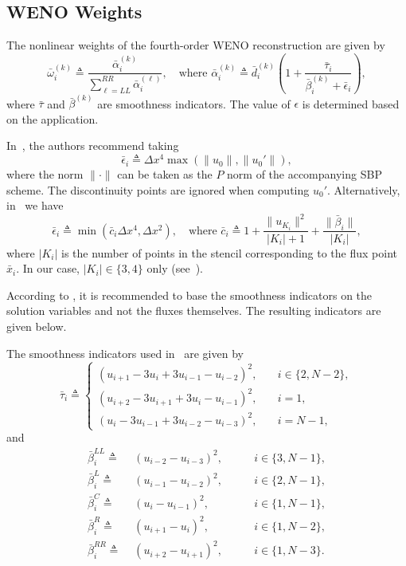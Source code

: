 \documentclass{scrartcl}
\begin{document}
\subsection{WENO Weights} %
\label{ssc:weno:weights}

\begin{definition} \label{def:weno:weights}
The nonlinear weights of the fourth-order WENO reconstruction are given by
\[
\bar{\omega}^{(k)}_i \triangleq \frac{\bar{\alpha}^{(k)}_i}{\displaystyle
    \sum_{\ell = LL}^{RR} \bar{\alpha}^{(\ell)}_i},
\quad \text{where }
\bar{\alpha}^{(k)}_i \triangleq \bar{d}^{(k)}_i \left(
1 + \frac{\bar{\tau}_i}{\bar{\beta}^{(k)}_i + \bar{\epsilon}_i}\right),
\]
where $\bar{\tau}$ and $\bar{\beta}^{(k)}$ are smoothness indicators. The value of
$\epsilon$ is determined based on the application.
\end{definition}

In~\cite{Fisher2011}, the authors recommend taking
\[
\bar{\epsilon}_i \triangleq \Delta x^4 \max (\|u_0\|, \|u_0'\|),
\]
where the norm $\|\cdot\|$ can be taken as the $P$ norm of the accompanying
SBP scheme. The discontinuity points are ignored when computing $u_0'$. Alternatively,
in~\cite{Fisher2012} we have
\[
\bar{\epsilon}_i \triangleq \min (\bar{c}_i \Delta x^4, \Delta x^2),
\quad \text{where }
\bar{c}_i \triangleq 1
    + \frac{\|u_{K_i}\|^2}{|K_i| + 1}
    + \frac{\|\bar{\beta}_i\|}{|K_i|},
\]
where $|K_i|$ is the number of points in the stencil corresponding to the flux
point $\bar{x}_i$. In our case, $|K_i| \in \{3, 4\}$ only
(see~).

According to \cite[Appendix A]{Fisher2011}, it is recommended to base the
smoothness indicators on the solution variables and not the fluxes themselves.
The resulting indicators are given below.

\begin{definition} \label{def:weno:smoothness}
The smoothness indicators used in~ are given by
\[
\bar{\tau}_i \triangleq
\begin{cases}
    (u_{i + 1} - 3 u_i + 3 u_{i - 1} - u_{i - 2})^2,
    & \quad i \in \{2, N - 2\}, \\
    (u_{i + 2} - 3 u_{i + 1} + 3 u_i - u_{i - 1})^2,
    & \quad i = 1, \\
    (u_i - 3 u_{i - 1} + 3 u_{i - 2} - u_{i - 3})^2,
    & \quad i = N - 1,
\end{cases}
\]
and
\[
\begin{aligned}
    \bar{\beta}_i^{LL} \triangleq\,\, &
    (u_{i - 2} - u_{i - 3})^2, & \qquad i \in \{3, N - 1\}, \\
    \bar{\beta}_i^{L} \triangleq\,\, &
    (u_{i - 1} - u_{i - 2})^2, & \qquad i \in \{2, N - 1\}, \\
    \bar{\beta}_i^{C} \triangleq\,\, &
    (u_i - u_{i - 1})^2, & \qquad i \in \{1, N - 1\}, \\
    \bar{\beta}_i^{R} \triangleq\,\, &
    (u_{i + 1} - u_i)^2, & \qquad i \in \{1, N - 2\}, \\
    \bar{\beta}_i^{RR} \triangleq\,\, &
    (u_{i + 2} - u_{i + 1})^2, & \qquad i \in \{1, N - 3\}.
\end{aligned}
\]
\end{definition}
\end{document}
